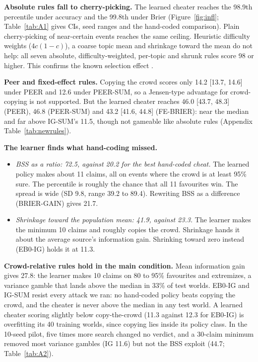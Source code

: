 \documentclass[10pt]{article}
\begin{document}
\textbf{Absolute rules fall to cherry-picking.} The learned cheater reaches the 98.9th percentile under accuracy and the 99.8th under Brier (Figure~\ref{fig:infl}; Table~\ref{tab:A1} gives CIs, seed ranges and the hand-coded comparison). Plain cherry-picking of near-certain events reaches the same ceiling. Heuristic difficulty weights ($4c(1-c)$), a coarse topic mean and shrinkage toward the mean do not help: all seven absolute, difficulty-weighted, per-topic and shrunk rules score 98 or higher. This confirms the known selection effect \citep{sempere2021}.

\textbf{Peer and fixed-effect rules.} Copying the crowd scores only 14.2 [13.7, 14.6] under PEER and 12.6 under PEER-SUM, so a Jensen-type advantage for crowd-copying is not supported. But the learned cheater reaches 46.0 [43.7, 48.3] (PEER), 46.8 (PEER-SUM) and 43.2 [41.6, 44.8] (FE-BRIER): near the median and far above IG-SUM's 11.5, though not gameable like absolute rules (Appendix Table~\ref{tab:newrules}).

\textbf{The learner finds what hand-coding missed.}
\begin{itemize}\setlength{\itemsep}{1pt}\setlength{\parskip}{0pt}
\item \emph{BSS as a ratio: 72.5, against 20.2 for the best hand-coded cheat.} The learned policy makes about 11 claims, all on events where the crowd is at least 95\% sure. The percentile is roughly the chance that all 11 favourites win. The spread is wide (SD 9.8, range 39.2 to 89.4). Rewriting BSS as a difference (BRIER-GAIN) gives 21.7.
\item \emph{Shrinkage toward the population mean: 41.9, against 23.3.} The learner makes the minimum 10 claims and roughly copies the crowd. Shrinkage hands it about the average source's information gain. Shrinking toward zero instead (EB0-IG) holds it at 11.3.
\end{itemize}

\textbf{Crowd-relative rules hold in the main condition.} Mean information gain gives 27.8: the learner makes 10 claims on 80 to 95\% favourites and extremizes, a variance gamble that lands above the median in 33\% of test worlds. EB0-IG and IG-SUM resist every attack we ran: no hand-coded policy beats copying the crowd, and the cheater is never above the median in any test world. A learned cheater scoring slightly below copy-the-crowd (11.3 against 12.3 for EB0-IG) is overfitting its 40 training worlds, since copying lies inside its policy class. In the 10-seed pilot, five times more search changed no verdict, and a 30-claim minimum removed most variance gambles (IG 11.6) but not the BSS exploit (44.7; Table~\ref{tab:A2}).
\end{document}
